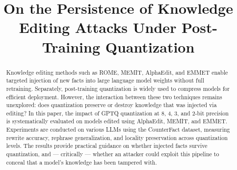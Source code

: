 \documentclass[conference]{IEEEtran}
\begin{document}
\title{On the Persistence of Knowledge Editing Attacks Under Post-Training Quantization}

\author{
    }

\maketitle


\begin{abstract}
    Knowledge editing methods such as ROME, MEMIT, AlphaEdit, and EMMET enable targeted injection of new facts into large language model weights without full retraining. Separately, post-training quantization is widely used to compress models for efficient deployment. However, the interaction between these two techniques remains unexplored: does quantization preserve or destroy knowledge that was injected via editing? In this paper, the impact of GPTQ quantization at 8, 4, 3, and 2-bit precision is systematically evaluated on models edited using AlphaEdit, MEMIT, and EMMET. Experiments are conducted on various LLMs using the CounterFact dataset, measuring rewrite accuracy, rephrase generalization, and locality preservation across quantization levels. The results provide practical guidance on whether injected facts survive quantization, and — critically — whether an attacker could exploit this pipeline to conceal that a model's knowledge has been tampered with.
\end{abstract}
\end{document}
